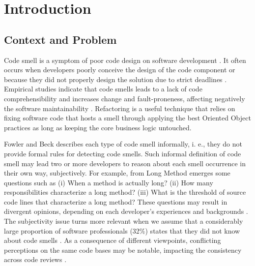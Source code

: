 \chapter{Introduction} 
\label{sec:introduction}

\section{Context and Problem}

Code smell is a symptom of poor code design on software development \cite{fowler1999refactoring}. It often occurs when developers poorly conceive the design of the code component or because they did not properly design the solution due to strict deadlines \cite{palomba2014they}. Empirical studies indicate that code smells leads to a lack of code comprehensibility \cite{abbes2011empirical} and increases change and fault-proneness, affecting negatively the software maintainability \cite{yamashita2013exploring}. Refactoring \cite{fowler1999refactoring} is a useful technique that relies on fixing software code that hosts a smell through applying the best Oriented Object practices as long as keeping the core business logic untouched.

Fowler and Beck \cite{fowler1999refactoring} describes each type of code smell informally, i. e., they do not provide formal rules for detecting code smells. Such informal definition of code smell may lead two or more developers to reason about each smell occurrence in their own way, subjectively. For example, from Long Method emerges some questions such as (i) When a method is actually long? (ii) How many responsibilities characterize a long method? (iii) What is the threshold of source code lines that characterize a long method? These questions may result in divergent opinions, depending on each developer's experiences and backgrounds \cite{hozano2018you}. The subjectivity issue turns more relevant when we assume that a considerably large proportion of software professionals (32\%) states that they did not know about code smells \cite{yamashita2013developers}. As a consequence of different viewpoints, conflicting perceptions on the same code bases may be notable, impacting the consistency across code reviews \cite{hozano2018you}.

